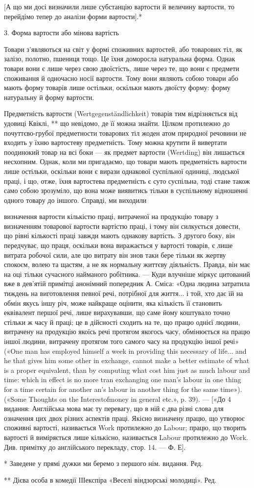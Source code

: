 [А що ми досі визначили лише субстанцію вартости й величину
вартости, то перейдімо тепер до аналізи форми вартости].*

3. Форма вартости або мінова вартість

Товари з’являються на світ у формі споживних вартостей, або
товарових тіл, як залізо, полотно, пшениця тощо. Це їхня доморосла
натуральна форма. Однак товари вони є лише через свою
двоїстість, лише через те, що вони є предмети споживання й одночасно
носії вартости. Тому вони являють собою товари або мають
форму товарів лише остільки, оскільки мають двоїсту форму:
форму натуральну й форму вартости.

Предметність вартости (Wertgegenständlichkeit) товарів тим
відрізняється від удовиці Квіклі, ** що невідомо, де її можна
знайти. Цілком протилежно до почуттєво-грубої предметности
товарових тіл жоден атом природної речовини не входить у їхню
вартостеву предметність. Тому можна крутити й вивертати поодинокий
товар на всі боки — як предмет вартости (Wertding)
він лишається несхопним. Однак, коли ми пригадаємо, що товари
мають предметність вартости лише остільки, оскільки вони є
вирази однакової суспільної одиниці, людської праці, і що, отже,
їхня вартостева предметність є суто суспільна, тоді стане також
само собою зрозуміло, що вона може виявитись тільки в суспільному
відношенні одного товару до іншого. Справді, ми виходили

визначення вартости кількістю праці, витраченої на продукцію товару
з визначенням товарової вартости вартістю праці, і тому він силкується
довести, що рівні кількості праці завжди мають однакову вартість. З другого
боку, він передчуває, що праця, оскільки вона виражається у вартості
товарів, є лише витрата робочої сили, але цю витрату він знов таки
бере тільки як жертву спокоєм, волею та щастям, а не як нормальну життєву
діяльність. Правда, він має на оці тільки сучасного найманого робітника.
— Куди влучніше міркує цитований вже в дев’ятій примітці анонімний
попередник А. Сміса: «Одна людина затратила тиждень на виготовлення
певної речі, потрібної для життя... і той, хто дає їй на обмін якусь
іншу річ, може найкраще оцінити, яка кількість її становить еквівалент
першої речі, лише вирахувавши, що саме йому коштувало точно стільки ж
часу й праці; це в дійсності сходить на те, що працю однієї людини, витрачену
на продукцію якоїсь речі протягом якогось часу, обмінюється
на працю іншої людини, витрачену протягом того самого часу на продукцію
іншої речі» («One man has employed himself a week in providing this
necessary of life... and he that gives him some other in exchange, cannot
make a better estimate of what is a proper equivalent, than by computing what
cost him just as much labour and time: which in effect is no more tran exchanging
one man’s labour in one thing for a time certain for another an’s labour
in another thing for the same time»). («Some Thoughts on the Interestofmoney
in general etc.», p. 39). — [«До 4 видання: Англійська мова має
ту перевагу, що в ній є два різні слова для означення цих двох різних аспектів
праці. Якісно визначену працю, що утворює споживні вартості,
називається Work протилежно до Labour; працю, що творить вартості
й виміряється лише кількісно, називається Labour протилежно до Work.
Див. примітку до англійського перекладу, стор. 14. — Ф. Е].

* Заведене у прямі дужки ми беремо з першого нім. видання. Ред.

** Дієва особа в комедії ІІІекспіра «Веселі віндзорські молодиці».
Ред.
